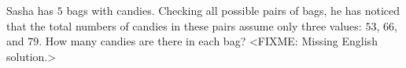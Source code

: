 \problem{}
Sasha has $5$ bags with candies.
Checking all possible pairs of bags, he has noticed that the total numbers of
candies in these pairs assume only three values: $53$, $66$, and $79$.
How many candies are there in each bag?
\solution
<FIXME: Missing English solution.>
\endproblem
